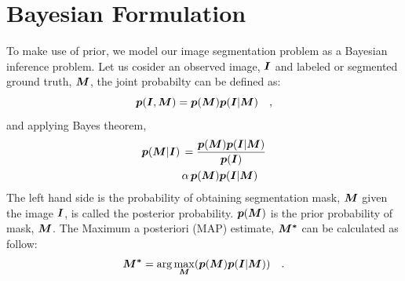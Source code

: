 \section{Bayesian Formulation}
To make use of prior, we model our image segmentation problem as a Bayesian inference problem. Let us cosider an observed image, $\boldsymbol{I}$ and labeled or segmented ground truth, $\boldsymbol{M}$, the joint probabilty can be defined as:
\begin{equation*}
\boldsymbol{p}(\boldsymbol{I}, \boldsymbol{M}) = \boldsymbol{p}(\boldsymbol{M}) \boldsymbol{p}(\boldsymbol{I}|\boldsymbol{M}) \quad ,
\end{equation*}
and applying Bayes theorem,
\begin{align*}
\boldsymbol{p}(\boldsymbol{M}|\boldsymbol{I}) \, & = \frac{\boldsymbol{p}(\boldsymbol{M}) \boldsymbol{p}(\boldsymbol{I}|\boldsymbol{M})}{\boldsymbol{p}(\boldsymbol{I})} \\
						& \alpha \, {\boldsymbol{p}(\boldsymbol{M}) \boldsymbol{p}(\boldsymbol{I}|\boldsymbol{M})}
\end{align*}
The left hand side is the probability of obtaining segmentation mask, $\boldsymbol{M}$ given the image $\boldsymbol{I}$, is called the posterior probability. $\boldsymbol{p}(\boldsymbol{M})$ is the prior probability of mask, $\boldsymbol{M}$. The Maximum a posteriori (MAP) estimate, $\boldsymbol{M^*}$ can be calculated as follow:
\begin{equation}
\boldsymbol{M^*} = \arg\max_{\boldsymbol{M}}({\boldsymbol{p}(\boldsymbol{M}) \boldsymbol{p}(\boldsymbol{I}|\boldsymbol{M})}) \quad .
\end{equation}

